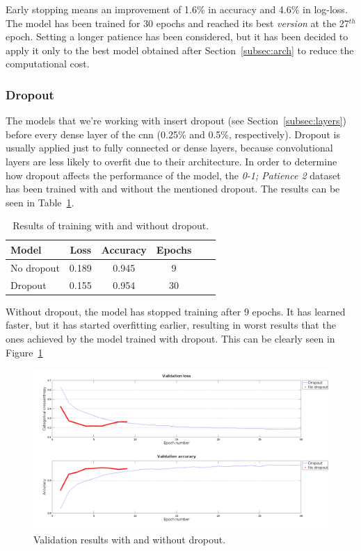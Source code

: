 Early stopping means an improvement of 1.6\% in accuracy and 4.6\% in log-loss. The model has been trained for 30 epochs and reached its best \textit{version} at the 27$^{th}$ epoch. Setting a longer patience has been considered, but it has been decided to apply it only to the best model obtained after Section~\ref{subsec:arch} to reduce the computational cost.

\subsubsection{Dropout}
The models that we're working with insert dropout (see Section~\ref{subsec:layers}) before every dense layer of the \gls{cnn} (0.25\% and 0.5\%, respectively). Dropout is usually applied just to fully connected or dense layers, because convolutional layers are less likely to overfit due to their architecture. In order to determine how dropout affects the performance of the model, the \textit{0-1; Patience 2} dataset has been trained with and without the mentioned dropout. The results can be seen in Table~\ref{tbl:dropout}. 
\begin{table}
	\centering
	\begin{tabular}{l*{4}{c}r}
		\textbf{Model} & \textbf{Loss} & \textbf{Accuracy} & \textbf{Epochs} \\
		\hline
		No dropout & 0.189 & 0.945 & 9 \\
		Dropout & 0.155 & 0.954 & 30 \\
	\end{tabular}
	\caption{Results of training with and without dropout.}
	\label{tbl:dropout}
\end{table}

Without dropout, the model has stopped training after 9 epochs. It has learned faster, but it has started overfitting earlier, resulting in worst results that the ones achieved by the model trained with dropout. This can be clearly seen in Figure~\ref{fig:comp_dropout}
\begin{figure}
	\centering
	\includegraphics[width=1\linewidth, keepaspectratio]{figures/comp_dropout.png}
	\caption{Validation results with and without dropout.}
	\label{fig:comp_dropout}
\end{figure}

